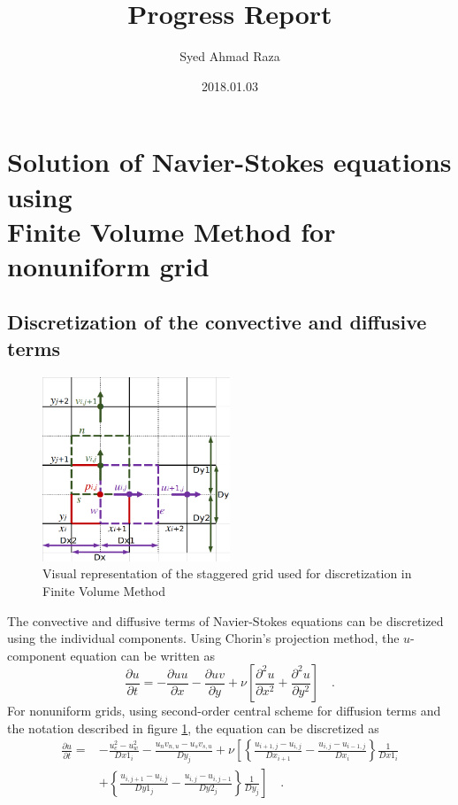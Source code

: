 \documentclass[12pt,a4paper,fleqn]{article}
\title{Progress Report}
\author{Syed Ahmad Raza}
\date{2018.01.03}
\begin{document}
\maketitle
\pagebreak

\section{Solution of Navier-Stokes equations using\\
    Finite Volume Method for nonuniform grid}

\subsection{Discretization of the convective and diffusive terms}

\begin{figure}[H]
    \centering
    \includegraphics[width=0.5\textwidth]{staggered_grid.png}
    \caption{Visual representation of the staggered grid used for discretization in Finite Volume Method}
    \label{fig:staggered-grid}
\end{figure}

The convective and diffusive terms of Navier-Stokes equations can be discretized using the individual components. Using Chorin's projection method, the $u$-component equation can be written as
\begin{equation} \label{eq:convective-diffusive-u}
\frac{\partial u}{\partial t} = -\frac{\partial uu}{\partial x} -\frac{\partial uv}{\partial y} + \nu\left[\frac{\partial^2u}{\partial x^2} + \frac{\partial^2u}{\partial y^2}\right] \quad.
\end{equation}
For nonuniform grids, using second-order central scheme for diffusion terms and the notation described in figure \ref{fig:staggered-grid}, the equation can be discretized as
\begin{align}\label{eq:discretized_convective-diffusive-u}
    \frac{\partial u}{\partial t} =
    {}& - \frac{u_e^2 - u_w^2}{Dx1_i} - \frac{u_n v_{n,u} - u_s v_{s,u}}{Dy_j} + \nu\left[
    \left\{
    \frac{u_{i+1,j}-u_{i,j}}{Dx_{i+1}}
    - \frac{u_{i,j}-u_{i-1,j}}{Dx_i}
    \right\}
    \frac{1}{Dx1_i}
    \right.\nonumber\\
    & \left. + \left\{
    \frac{u_{i,j+1}-u_{i,j}}{Dy1_j}
    - \frac{u_{i,j}-u_{i,j-1}}{Dy2_j}
    \right\}
    \frac{1}{Dy_j}
    \right] \quad .
\end{align}
\end{document}
